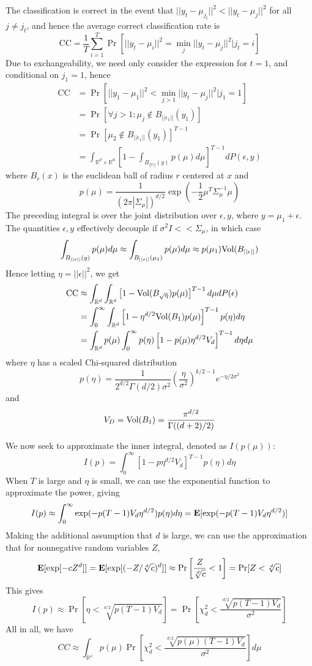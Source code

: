 \documentclass[11pt]{article}
\begin{document}
The classification is correct in the event that $||y_t - \mu_{j_t}||^2
< ||y_t - \mu_j||^2$ for all $j \neq j_t$, and hence the average correct classification rate is
\[
\text{CC} = \frac{1}{T}\sum_{i=1}^T \Pr[||y_t - \mu_i||^2 = \min_j ||y_t - \mu_j||^2 | j_t = i]
\]
Due to exchangeability, we need only consider the expression for $t = 1$, and conditional on $j_1 = 1$, hence
\begin{align*}
\text{CC} &= \Pr[||y_1 - \mu_1||^2 < \min_{j > 1} ||y_t - \mu_j||^2 | j_1 = 1]
\\&= \Pr[\forall j  > 1: \mu_j \notin B_{||\epsilon_1||}(y_1)]
\\&= \Pr[\mu_2 \notin B_{||\epsilon_1||}(y_1)]^{T - 1}
\\&= \int_{\mathbb{R}^d \times \mathbb{R}^d} \left[1 - \int_{B_{||\epsilon||}(y)} p(\mu) d\mu\right]^{T-1} dP(\epsilon, y)
\end{align*}
where $B_r(x)$ is the euclidean ball of radius $r$ centered at $x$ and
\[
p(\mu) = \frac{1}{(2\pi|\Sigma_\mu|)^{d/2}} \exp(-\frac{1}{2}\mu^T \Sigma_\mu^{-1} \mu)
\]
The preceding integral is over the joint distribution over $\epsilon, y$, where $y = \mu_1 + \epsilon$.  The quantities $\epsilon, y$ effectively decouple if $\sigma^2 I << \Sigma_\mu$, in which case
\[
\int_{B_{||\epsilon||}(y)} p(\mu) d\mu \approx \int_{B_{||\epsilon||}(\mu_1)} p(\mu) d\mu \approx p(\mu_1) \text{Vol}(B_{||\epsilon||})
\]
Hence letting $\eta  = ||\epsilon||^2$, we get
\begin{align*}
\text{CC} &\approx \int_{\mathbb{R}^d} \int_{\mathbb{R}^d} \left[1 - \text{Vol}(B_{\sqrt{\eta}}) p(\mu)\right]^{T-1} d\mu dP(\epsilon)
\\&= \int_0^\infty \int_{\mathbb{R}^d} \left[1 - \eta^{d/2} \text{Vol}(B_1) p(\mu)\right]^{T-1} p(\eta) d\eta
\\&= \int_{\mathbb{R}^d} p(\mu) \int_0^\infty  p(\eta) \left[1 - p(\mu) \eta^{d/2} V_d \right]^{T-1} d\eta d\mu
\end{align*}
where $\eta$ has a scaled Chi-squared distribution
\[
p(\eta) = \frac{1}{2^{d/2}\Gamma(d/2)\sigma^2} \left(\frac{\eta}{\sigma^2}\right)^{k/2 - 1} e^{-\eta/2\sigma^2}
\]
and
\[
V_D = \text{Vol}(B_1) = \frac{\pi^{d/2}}{\Gamma((d+2)/2)}
\]

We now seek to approximate the inner integral, denoted as $I(p(\mu))$:
\[
I(p) = \int_0^\infty \left[1 - p \eta^{d/2} V_d \right]^{T-1} p(\eta) d\eta
\]
When $T$ is large and $\eta$ is small, we can use the exponential
function to approximate the power, giving
\[
I(p) \approx \int_0^\infty \exp(-p(T-1)V_d \eta^{d/2}) p(\eta) d\eta = \textbf{E}[\exp(-p(T-1) V_d \eta^{d/2})]
\]
Making the additional assumption that $d$ is large, we can use the approximation that for nonnegative random variables $Z$,
\[
\textbf{E}[\exp[-cZ^d]] = \textbf{E}[\exp[(-Z/\sqrt[d]{c})^d]] \approx \Pr\left[\frac{Z}{\sqrt[d]{c}} < 1\right] = \Pr[Z < \sqrt[d]{c}]
\]
This gives
\[
I(p) \approx \Pr[\eta < \sqrt[d/2]{p (T-1) V_d}] = \Pr\left[\chi^2_d < \frac{\sqrt[d/2]{p (T-1) V_d}}{\sigma^2}\right]
\]
All in all, we have
\[
CC \approx \int_\mathbb{R^d} p(\mu) \Pr\left[\chi^2_d < \frac{\sqrt[d/2]{p(\mu) (T-1) V_d}}{\sigma^2}\right] d\mu
\]
\end{document}

